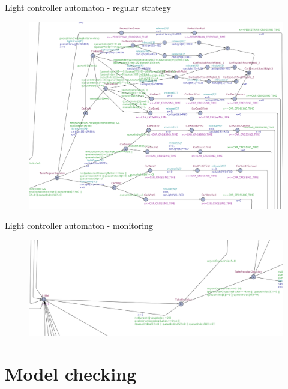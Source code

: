 \documentclass{bredelebeamer}
\begin{document}
\begin{frame}{Light controller automaton - regular strategy}
\begin{figure}[h]
\centering
\includegraphics[scale=0.18]{images/light_controller_regular_strategy.png}
\end{figure}
\end{frame}

\begin{frame}{Light controller automaton - monitoring}
\begin{figure}[h]
\centering
\includegraphics[width=\textwidth]{images/light_controller_monitor.png}
\end{figure}
\end{frame}

\section{Model checking}
\end{document}
